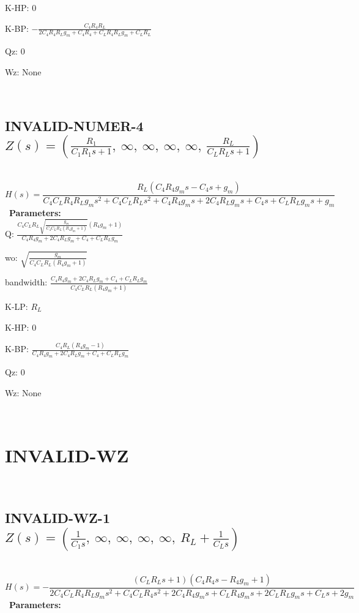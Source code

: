 \documentclass{article}
\begin{document}
K-HP: $0$\ 

K-BP: $- \frac{C_{4} R_{4} R_{L}}{2 C_{4} R_{4} R_{L} g_{m} + C_{4} R_{4} + C_{L} R_{4} R_{L} g_{m} + C_{L} R_{L}}$\ 

Qz: $0$\ 

Wz: $\text{None}$\ 

\ 

\subsection{INVALID-NUMER-4 $Z(s) = \left( \frac{R_{1}}{C_{1} R_{1} s + 1}, \  \infty, \  \infty, \  \infty, \  \infty, \  \frac{R_{L}}{C_{L} R_{L} s + 1}\right)$ } \ 
\textbf{\[H(s) = \frac{R_{L} \left(C_{4} R_{4} g_{m} s - C_{4} s + g_{m}\right)}{C_{4} C_{L} R_{4} R_{L} g_{m} s^{2} + C_{4} C_{L} R_{L} s^{2} + C_{4} R_{4} g_{m} s + 2 C_{4} R_{L} g_{m} s + C_{4} s + C_{L} R_{L} g_{m} s + g_{m}}\] } \ 
\textbf{Parameters:}\\ 

Q: $\frac{C_{4} C_{L} R_{L} \sqrt{\frac{g_{m}}{C_{4} C_{L} R_{L} \left(R_{4} g_{m} + 1\right)}} \left(R_{4} g_{m} + 1\right)}{C_{4} R_{4} g_{m} + 2 C_{4} R_{L} g_{m} + C_{4} + C_{L} R_{L} g_{m}}$\ 

wo: $\sqrt{\frac{g_{m}}{C_{4} C_{L} R_{L} \left(R_{4} g_{m} + 1\right)}}$\ 

bandwidth: $\frac{C_{4} R_{4} g_{m} + 2 C_{4} R_{L} g_{m} + C_{4} + C_{L} R_{L} g_{m}}{C_{4} C_{L} R_{L} \left(R_{4} g_{m} + 1\right)}$\ 

K-LP: $R_{L}$\ 

K-HP: $0$\ 

K-BP: $\frac{C_{4} R_{L} \left(R_{4} g_{m} - 1\right)}{C_{4} R_{4} g_{m} + 2 C_{4} R_{L} g_{m} + C_{4} + C_{L} R_{L} g_{m}}$\ 

Qz: $0$\ 

Wz: $\text{None}$\ 

\ 

\section{INVALID-WZ}\ 
\subsection{INVALID-WZ-1 $Z(s) = \left( \frac{1}{C_{1} s}, \  \infty, \  \infty, \  \infty, \  \infty, \  R_{L} + \frac{1}{C_{L} s}\right)$ } \ 
\textbf{\[H(s) = - \frac{\left(C_{L} R_{L} s + 1\right) \left(C_{4} R_{4} s - R_{4} g_{m} + 1\right)}{2 C_{4} C_{L} R_{4} R_{L} g_{m} s^{2} + C_{4} C_{L} R_{4} s^{2} + 2 C_{4} R_{4} g_{m} s + C_{L} R_{4} g_{m} s + 2 C_{L} R_{L} g_{m} s + C_{L} s + 2 g_{m}}\] } \ 
\textbf{Parameters:}\\ 
\end{document}
